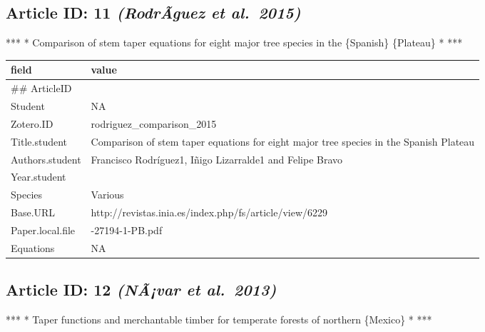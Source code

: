 \documentclass[]{article}
\begin{document}
\hypertarget{article-id-11-rodraguez-et-al.2015}{%
\subsection{\texorpdfstring{Article ID: 11 \textbf{\emph{(RodrÃ­guez et
al.~2015)}}}{Article ID: 11 (RodrÃ­guez et al.~2015)}}\label{article-id-11-rodraguez-et-al.2015}}

*** * Comparison of stem taper equations for eight major tree species in
the \{Spanish\} \{Plateau\} * ***

\begin{table}[H]
\centering
\begin{tabular}{>{\raggedright\arraybackslash}p{2cm}>{\raggedright\arraybackslash}p{8cm}}
\toprule
field & value\\
\midrule
\#\# ArticleID & 11\\
Student & NA\\
Zotero.ID & rodriguez\_comparison\_2015\\
Title.student & Comparison of stem taper equations for eight major tree species in the Spanish Plateau\\
Authors.student & Francisco Rodríguez1, Iñigo Lizarralde1 and Felipe Bravo\\
\addlinespace
Year.student & 2015\\
Species & Various\\
Base.URL & http://revistas.inia.es/index.php/fs/article/view/6229\\
Paper.local.file & 6229-27194-1-PB.pdf\\
Equations & NA\\
\bottomrule
\end{tabular}
\end{table}

\hypertarget{article-id-12-navar-et-al.2013}{%
\subsection{\texorpdfstring{Article ID: 12 \textbf{\emph{(NÃ¡var et
al.~2013)}}}{Article ID: 12 (NÃ¡var et al.~2013)}}\label{article-id-12-navar-et-al.2013}}

*** * Taper functions and merchantable timber for temperate forests of
northern \{Mexico\} * ***
\end{document}
